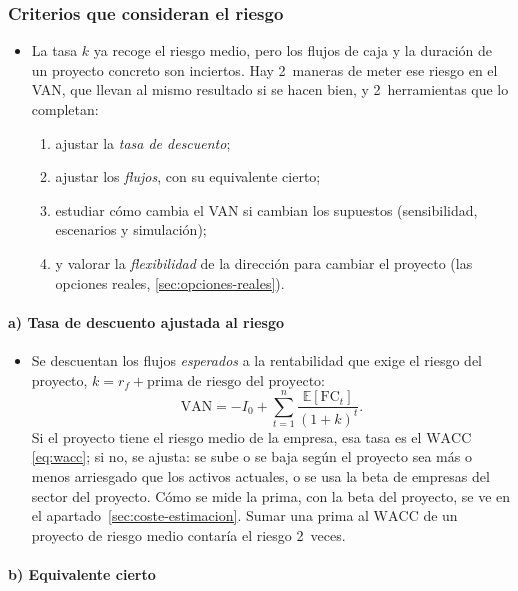 \documentclass[11pt]{article}
\begin{document}
\subsubsection{Criterios que consideran el riesgo}\label{sec:criterios-riesgo}

\begin{itemize}
\item La tasa $k$ ya recoge el riesgo medio, pero los flujos de caja y la duración de un proyecto concreto son inciertos. Hay 2~maneras de meter ese riesgo en el VAN, que llevan al mismo resultado si se hacen bien, y 2~herramientas que lo completan:
  \begin{enumerate}
  \item ajustar la \emph{tasa de descuento};
  \item ajustar los \emph{flujos}, con su equivalente cierto;
  \item estudiar cómo cambia el VAN si cambian los supuestos (sensibilidad, escenarios y simulación);
  \item y valorar la \emph{flexibilidad} de la dirección para cambiar el proyecto (las opciones reales, \ref{sec:opciones-reales}).
  \end{enumerate}
\end{itemize}

\paragraph{a) Tasa de descuento ajustada al riesgo}

\begin{itemize}
\item Se descuentan los flujos \emph{esperados} a la rentabilidad que exige el riesgo del proyecto, $k=r_f+\text{prima de riesgo del proyecto}$:
  \[
  \mathrm{VAN}=-I_0+\sum_{t=1}^{n}\frac{\mathbb{E}[\mathrm{FC}_t]}{(1+k)^t}.
  \]
  Si el proyecto tiene el riesgo medio de la empresa, esa tasa es el $\mathrm{WACC}$ \eqref{eq:wacc}; si no, se ajusta: se sube o se baja según el proyecto sea más o menos arriesgado que los activos actuales, o se usa la beta de empresas del sector del proyecto. Cómo se mide la prima, con la beta del proyecto, se ve en el apartado~\ref{sec:coste-estimacion}. Sumar una prima al $\mathrm{WACC}$ de un proyecto de riesgo medio contaría el riesgo 2~veces.
\end{itemize}

\paragraph{b) Equivalente cierto}
\end{document}
